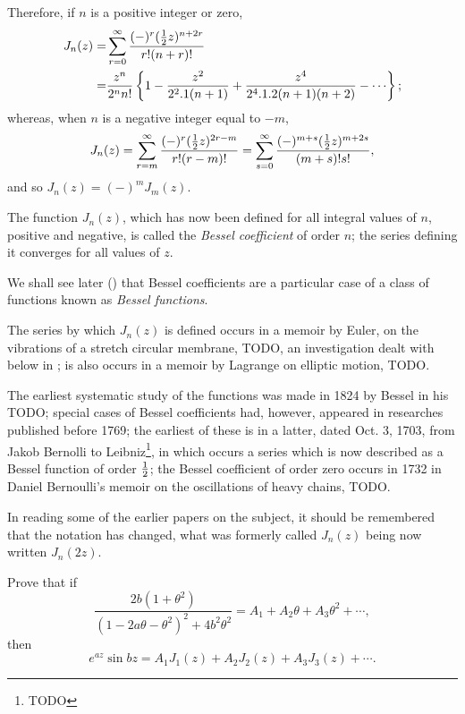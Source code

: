 \documentclass{book}
\begin{document}
Therefore, if $n$ is a positive integer or zero, 
\begin{align*}
J_n(z) =& \sum_{r=0}^{\infty} \frac{ (-)^r (\half z)^{n+2r} }{
  r!(n+r)! } \\
=& \frac{ z^n }{ 2^n n! } 
\thebrace{ 1 - \frac{z^2}{2^2.1(n+1)} + \frac{z^4}{2^4.1.2(n+1)(n+2)}
  - \cdots };
\end{align*}
%
%
whereas, when $n$ is a negative integer equal to $-m$,
$$
J_n(z)
= \sum_{r=m}^{\infty} \frac{ (-)^r (\frac{1}{2} z)^{2r-m} }{ r!(r-m)!  }
  = \sum_{s=0}^{\infty} \frac{ (-)^{m+s} (\frac{1}{2} z)^{m+2s}  }{ (m+s)! s!  },
  $$
  and so $J_n(z) = (-)^m J_m(z)$.

The function $J_n(z)$, which has now been defined for all integral
values of $n$, positive and negative, is called the
\emph{Bessel coefficient} of order $n$; the series defining it 
converges for all values of $z$.

We shall see later () that Bessel
coefficients are a particular case of a class of functions known as
\emph{Bessel functions}.

The series by which $J_n(z)$ is defined occurs in a memoir by Euler,
on the vibrations of a stretch circular membrane, TODO, 
an investigation dealt with below in ;
is also occurs in a memoir by Lagrange on elliptic motion, TODO.

The earliest systematic study of the functions was made in 1824 by
Bessel in his TODO; special cases of Bessel coefficients had, however,
appeared in researches published before 1769; the earliest of these is
in a latter, dated Oct. 3, 1703, from Jakob Bernolli to
Leibniz\footnote{TODO}, in which occurs a series which is now
described as a Bessel function of order $\frac{1}{2}$; the Bessel
coefficient of order zero occurs in 1732 in Daniel Bernoulli's memoir
on the oscillations of heavy chains, TODO.

In reading some of the earlier papers on the subject, it should be
remembered that the notation has changed, what was formerly called
$J_n(z)$ being now written $J_n(2z)$.
\begin{wandwexample}
Prove that if 
$$
\frac{ 2b(1+\theta^2)  }{ (1-2a\theta-\theta^2)^2 + 4b^2\theta^2  }
=
A_1 + A_2 \theta + A_3 \theta^2 + \cdots,
$$
then
$$
e^{az} \sin bz 
=
A_1 J_1(z) + A_2 J_2(z) + A_3 J_3(z) + \cdots.
$$
\end{wandwexample}
\end{document}
